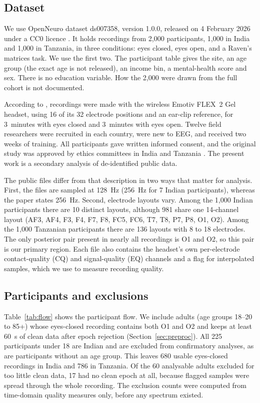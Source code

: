 \documentclass[11pt,a4paper]{article}
\begin{document}
\subsection{Dataset}

We use OpenNeuro dataset ds007358, version 1.0.0, released on 4 February 2026 under a CC0
licence \citep{openneuro_ds007358}. It holds recordings from 2,000 participants, 1,000 in
India and 1,000 in Tanzania, in three conditions: eyes closed, eyes open, and a Raven's
matrices task. We use the first two. The participant table gives the site, an age group
(the exact age is not released), an income bin, a mental-health score and sex. There is no
education variable. How the 2,000 were drawn from the full cohort is not documented.

According to \citet{vianney2025}, recordings were made with the wireless Emotiv FLEX~2 Gel
headset, using 16 of its 32 electrode positions and an ear-clip reference, for 3~minutes
with eyes closed and 3~minutes with eyes open. Twelve field researchers were recruited in
each country, were new to EEG, and received two weeks of training. All participants gave
written informed consent, and the original study was approved by ethics committees in
India and Tanzania \citep{vianney2025}. The present work is a secondary analysis of
de-identified public data.

The public files differ from that description in two ways that matter for analysis.
First, the files are sampled at 128~Hz (256~Hz for 7 Indian participants), whereas the
paper states 256~Hz. Second, electrode layouts vary. Among the 1,000 Indian participants
there are 10 distinct layouts, although 981 share one 14-channel layout (AF3, AF4, F3, F4,
F7, F8, FC5, FC6, T7, T8, P7, P8, O1, O2). Among the 1,000 Tanzanian participants there are
136 layouts with 8 to 18 electrodes. The only posterior pair present in nearly all
recordings is O1 and O2, so this pair is our primary region. Each file also contains the
headset's own per-electrode contact-quality (CQ) and signal-quality (EQ) channels and a
flag for interpolated samples, which we use to measure recording quality.

\subsection{Participants and exclusions}

Table~\ref{tab:flow} shows the participant flow. We include adults (age groups 18--20 to
85+) whose eyes-closed recording contains both O1 and O2 and keeps at least 60~s of clean
data after epoch rejection (Section~\ref{sec:preproc}). All 225 participants under 18 are
Indian and are excluded from confirmatory analyses, as are participants without an age
group. This leaves 680 usable eyes-closed recordings in India and 786 in Tanzania. Of the
60 analysable adults excluded for too little clean data, 17 had no clean epoch at all,
because flagged samples were spread through the whole recording. The exclusion counts were
computed from time-domain quality measures only, before any spectrum existed.
\end{document}

